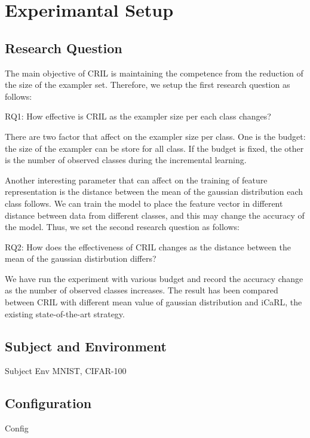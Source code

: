 \section{Experimantal Setup}
\label{sec:setup}

\subsection{Research Question}
\label{sec:rq}

The main objective of CRIL is maintaining the competence from the reduction of the size of the exampler set. Therefore, we setup the first research question as follows:

\begin{framed}
\textsc{RQ1}: How effective is CRIL as the exampler size per each class changes?
\label{rq1}
\end{framed}

There are two factor that affect on the exampler size per class. One is the budget: the size of the exampler can be store for all class. If the budget is fixed, the other is the number of observed classes during the incremental learning.

Another interesting parameter that can affect on the training of feature representation is the distance between the mean of the gaussian distribution each class follows. We can train the model to place the feature vector in different distance between data from different classes, and this may change the accuracy of the model. Thus, we set the second research question as follows:

\begin{framed}
\textsc{RQ2}: How does the effectiveness of CRIL changes as the distance between the mean of the gaussian distirbution differs?
\label{rq2}
\end{framed}

We have run the experiment with various budget and record the accuracy change as the number of observed classes increases. The result has been compared between CRIL with different mean value of gaussian distribution and iCaRL, the existing state-of-the-art strategy.

\subsection{Subject and Environment}
\label{sec:subject}

Subject
Env
MNIST, CIFAR-100

\subsection{Configuration}
\label{sec:configuration}


Config
